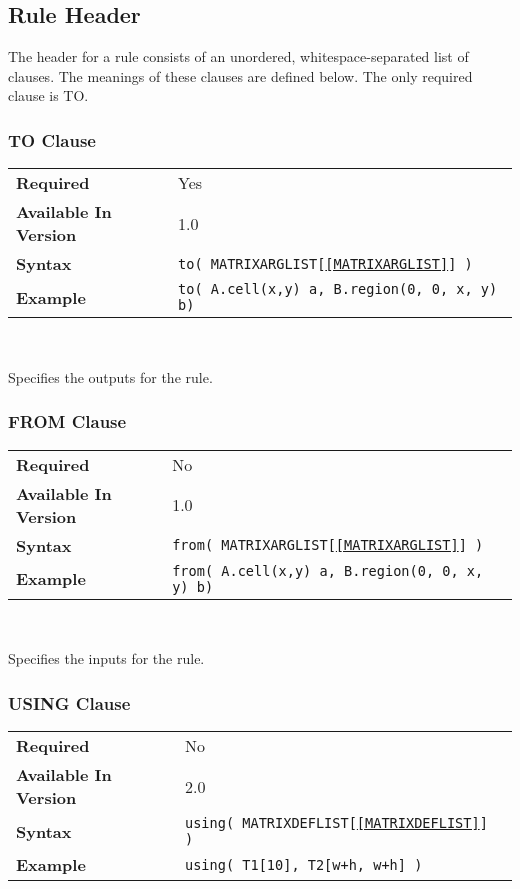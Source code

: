 \documentclass[11pt]{article}
\begin{document}
\subsection{Rule Header}
\label{sec:rule}

The header for a rule consists of an unordered, whitespace-separated list
of clauses.  The meanings of these clauses are defined below.  The only
required clause is TO.

\subsubsection{TO Clause}
\label{TO}
\begin{tabular}{| l | l |}
\hline
\bf Required & Yes                          \\
\bf Available In Version & 1.0             \\
\bf Syntax & \tt to( MATRIXARGLIST[\ref{MATRIXARGLIST}] ) \\
\bf Example & \tt to( A.cell(x,y) a, B.region(0, 0, x, y) b)\\
\hline
\end{tabular}

~

\noindent Specifies the outputs for the rule.

\subsubsection{FROM Clause}
\label{FROM}
\begin{tabular}{| l | l |}
\hline
\bf Required & No                          \\
\bf Available In Version & 1.0             \\
\bf Syntax & \tt from( MATRIXARGLIST[\ref{MATRIXARGLIST}] ) \\
\bf Example & \tt from( A.cell(x,y) a, B.region(0, 0, x, y) b)\\
\hline
\end{tabular}

~

\noindent Specifies the inputs for the rule.

\subsubsection{USING Clause}
\label{USING}
\begin{tabular}{| l | l |}
\hline
\bf Required & No \\
\bf Available In Version & 2.0             \\
\bf Syntax & \tt using( MATRIXDEFLIST[\ref{MATRIXDEFLIST}] ) \\
\bf Example & \tt using( T1[10], T2[w+h, w+h] ) \\
\hline
\end{tabular}
\end{document}
